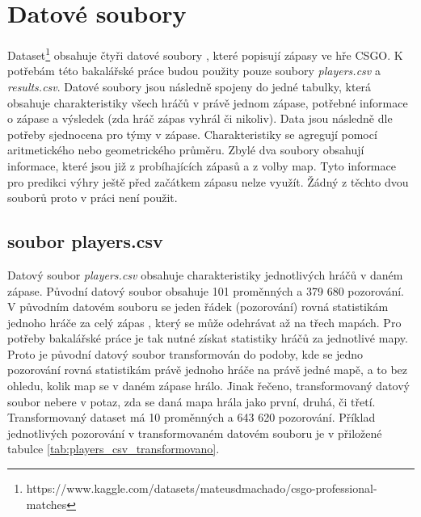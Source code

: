 \section{Datové soubory}
Dataset\footnote{https://www.kaggle.com/datasets/mateusdmachado/csgo-professional-matches} obsahuje čtyři 
{\color{red}
datové soubory
}
, které popisují zápasy ve hře
\ac{CSGO}. K potřebám této bakalářské práce budou použity pouze soubory \textit{players.csv} a \textit{results.csv}. Datové soubory jsou následně spojeny do jedné tabulky,
která obsahuje charakteristiky všech hráčů v právě jednom zápase, potřebné informace o zápase a výsledek (zda hráč zápas vyhrál či nikoliv). Data jsou následně dle potřeby
sjednocena pro týmy v zápase. Charakteristiky se agregují pomocí aritmetického nebo geometrického průměru. Zbylé dva soubory obsahují
informace, které jsou již z probíhajících zápasů a z volby map. Tyto informace pro predikci výhry ještě před začátkem zápasu nelze využít. Žádný z těchto
dvou souborů proto v práci není použit.

\subsection{soubor players.csv}
{\color{red}
Datový soubor
}
\textit{players.csv} obsahuje 
{\color{red}
charakteristiky
}
jednotlivých hráčů v daném zápase. Původní datový soubor obsahuje 101 proměnných a 379 680 pozorování.
V původním datovém souboru se jeden řádek (pozorování) rovná statistikám jednoho hráče za celý zápas
{\color{red}
, který se může odehrávat až na třech mapách.
}
Pro potřeby bakalářské práce je tak nutné získat statistiky hráčů
za jednotlivé mapy. Proto je původní datový soubor transformován do podoby, kde se jedno pozorování rovná statistikám
právě jednoho hráče na právě jedné mapě, a to bez ohledu, kolik map se v daném zápase hrálo. Jinak řečeno, transformovaný datový soubor nebere v potaz, zda
se daná mapa hrála jako první, druhá, či třetí.
Transformovaný dataset má 10 proměnných a 643 620 pozorování. Příklad jednotlivých pozorování v transformovaném
datovém souboru je v přiložené tabulce \ref{tab:players_csv_transformovano}.

